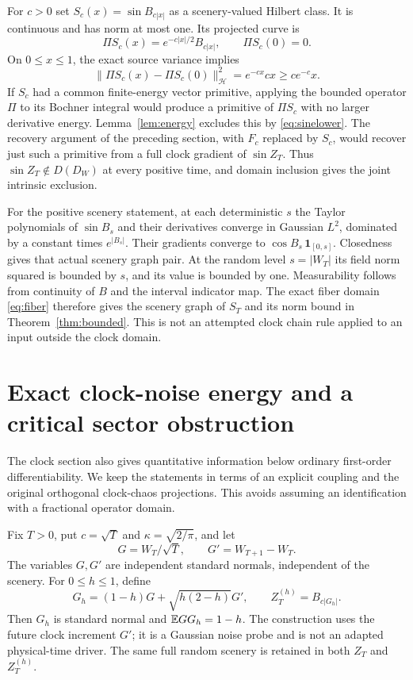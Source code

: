 \documentclass[11pt]{article}
\newcommand{\Hh}{\mathcal H}\newcommand{\code}[1]{{\small\nolinkurl{#1}}}
\begin{document}
For $c>0$ set $S_c(x)=\sin B_{c|x|}$ as a
scenery-valued Hilbert class. It is continuous and has
norm at most one. Its projected curve is
\[
 \Pi S_c(x)=e^{-c|x|/2}B_{c|x|},\qquad \Pi S_c(0)=0.
\]
On $0\leq x\leq1$, the exact source variance implies
\begin{equation}\label{eq:sinelower}
 \|\Pi S_c(x)-\Pi S_c(0)\|_{\Hh}^2
       =e^{-cx}cx\geq ce^{-c}x.
\end{equation}
If $S_c$ had a common finite-energy vector primitive,
applying the bounded operator $\Pi$ to its Bochner
integral would produce a primitive of $\Pi S_c$ with
no larger derivative energy. Lemma~\ref{lem:energy}
excludes this by \eqref{eq:sinelower}.
The recovery argument of the preceding section, with
$F_c$ replaced by $S_c$, would recover just such a
primitive from a full clock gradient of $\sin Z_T$.
Thus $\sin Z_T\notin D(D_W)$ at every positive time,
and domain inclusion gives the joint intrinsic exclusion.

For the positive scenery statement, at each deterministic
$s$ the Taylor polynomials of $\sin B_s$ and their
derivatives converge in Gaussian $L^2$, dominated by
a constant times $e^{|B_s|}$. Their gradients converge
to $\cos B_s\,\mathbf1_{[0,s]}$. Closedness gives that
actual scenery graph pair. At the random level
$s=|W_T|$ its field norm squared is bounded by $s$,
and its value is bounded by one. Measurability follows
from continuity of $B$ and the interval indicator map.
The exact fiber domain \eqref{eq:fiber} therefore gives
the scenery graph of $S_T$ and its norm bound in
Theorem~\ref{thm:bounded}.
This is not an attempted clock chain rule applied to
an input outside the clock domain.

\section{Exact clock-noise energy and a critical sector obstruction}
\label{sec:noise}
The clock section also gives quantitative information below ordinary
first-order differentiability. We keep the statements in terms of an
explicit coupling and the original orthogonal clock-chaos projections.
This avoids assuming an identification with a fractional operator domain.

Fix $T>0$, put $c=\sqrt T$ and $\kappa=\sqrt{2/\pi}$, and let
\[
 G=W_T/\sqrt T,\qquad G'=W_{T+1}-W_T.
\]
The variables $G,G'$ are independent standard normals, independent of
the scenery. For $0\leq h\leq1$, define
\[
 G_h=(1-h)G+\sqrt{h(2-h)}G',\qquad Z_T^{(h)}=B_{c|G_h|}.
\]
Then $G_h$ is standard normal and $\mathbb E GG_h=1-h$. The construction
uses the future clock increment $G'$; it is a Gaussian noise probe and
is not an adapted physical-time driver. The same full random scenery
is retained in both $Z_T$ and $Z_T^{(h)}$.
\end{document}
